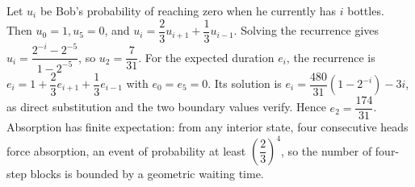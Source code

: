 Let $u_i$ be Bob's probability of reaching zero when he currently has $i$ bottles. Then $u_0=1,u_5=0$, and $u_i=\dfrac{2}{3}u_{i+1}+\dfrac{1}{3}u_{i-1}$. Solving the recurrence gives $u_i=\dfrac{2^{-i}-2^{-5}}{1-2^{-5}}$, so $\boxed{u_2=\dfrac{7}{31}}$. For the expected duration $e_i$, the recurrence is $e_i=1+\dfrac{2}{3}e_{i+1}+\dfrac{1}{3}e_{i-1}$ with $e_0=e_5=0$. Its solution is $e_i=\dfrac{480}{31}(1-2^{-i})-3i$, as direct substitution and the two boundary values verify. Hence $\boxed{e_2=\dfrac{174}{31}}$. Absorption has finite expectation: from any interior state, four consecutive heads force absorption, an event of probability at least $(\dfrac{2}{3})^4$, so the number of four-step blocks is bounded by a geometric waiting time.

